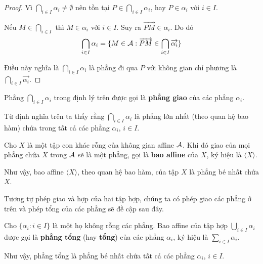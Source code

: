 \begin{proof}
	Vì $\bigcap_{i \in I} \alpha_i \neq \emptyset$ nên tồn tại $P \in \bigcap_{i \in I} \alpha_i$, hay $P \in \alpha_i$ với $i \in I$.
	
	Nếu $\displaystyle{M \in \bigcap_{i \in I}}$ thì $M \in \alpha_i$ với $i \in I$. Suy ra $\overrightarrow{PM} \in \alpha_i$. Do đó 
    \begin{equation*}
        \displaystyle{\bigcap_{i \in I} \alpha_i = \{ M \in \mathcal{A}: \overrightarrow{PM} \in \bigcap_{i \in I} \overrightarrow{\alpha_i}\}}
    \end{equation*}
	
	Điều này nghĩa là $\displaystyle{\bigcap_{i \in I} \alpha_i}$ là phẳng đi qua $P$ với không gian chỉ phương là $\displaystyle{\bigcap_{i \in I} \overrightarrow{\alpha_i}}$.
\end{proof}

\begin{definition}
	Phẳng $\displaystyle{\bigcap_{i \in I} \alpha_i}$ trong định lý trên được gọi là \textbf{phẳng giao} của các phẳng $\alpha_i$.
\end{definition}

Từ định nghĩa trên ta thấy rằng $\displaystyle{\bigcap_{i \in I} \alpha_i}$ là phẳng lớn nhất (theo quan hệ bao hàm) chứa trong tất cả các phẳng $\alpha_i$, $i \in I$.

\begin{definition}
	Cho $X$ là một tập con khác rỗng của không gian affine $\mathcal{A}$. Khi đó giao của mọi phẳng chứa $X$ trong $\mathcal{A}$ sẽ là một phẳng, gọi là \textbf{bao affine} của $X$, ký hiệu là $\langle X \rangle$.
\end{definition}

Như vậy, bao affine $\langle X \rangle$, theo quan hệ bao hàm, của tập $X$ là phẳng bé nhất chứa $X$.

Tương tự phép giao và hợp của hai tập hợp, chúng ta có phép giao các phẳng ở trên và phép tổng của các phẳng sẽ đề cập sau đây.

\begin{definition}
	Cho $\{ \alpha_i: i \in I \}$ là một họ không rỗng các phẳng. Bao affine của tập hợp $\displaystyle{\bigcup_{i \in I} \alpha_i}$ được gọi là \textbf{phẳng tổng} (hay \textbf{tổng}) của các phẳng $\alpha_i$, ký hiệu là $\displaystyle{\sum_{i \in I} \alpha_i}$.
\end{definition}

Như vậy, phẳng tổng là phẳng bé nhất chứa tất cả các phẳng $\alpha_i$, $i \in I$. 


